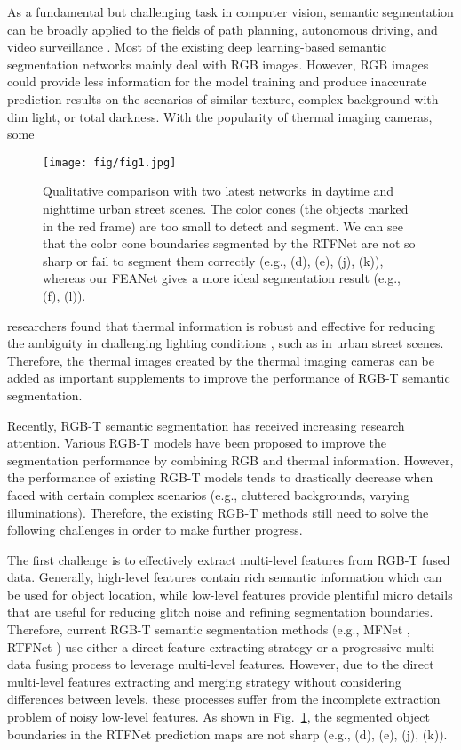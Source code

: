 \documentclass[letterpaper, 10 pt, conference]{ieeeconf}  \usepackage{graphicx}
\begin{document}
As a fundamental but challenging task in computer vision, semantic segmentation can be broadly applied to the fields of path planning, autonomous driving, and video surveillance \cite{kang2011multiband} \cite{li2017traffic} \cite{chen2018importance}. Most of the existing deep learning-based semantic segmentation networks \cite{garcia2017review} \cite{romera2017erfnet} mainly deal with RGB images. However, RGB images could provide less information for the model training and produce inaccurate prediction results on the scenarios of similar texture, complex background with dim light, or total darkness. With the popularity of thermal imaging cameras, some
\begin{figure}[h]
    \centering
    \texttt{[image: fig/fig1.jpg]}
    \vspace{-5mm}
    \caption{Qualitative comparison with two latest networks in daytime and nighttime urban street scenes. The color cones (the objects marked in the red frame) are too small to detect and segment. We can see that the color cone boundaries segmented by the RTFNet are not so sharp or fail to segment them correctly (e.g., (d), (e), (j), (k)), whereas our FEANet gives a more ideal segmentation result (e.g., (f), (l)).}
    \label{fig:fig1}
    \vspace{-5mm}
\end{figure}
researchers found that thermal information is robust and effective for reducing the ambiguity in challenging lighting conditions \cite{ha2017mfnet}, such as in urban street scenes. Therefore, the thermal images created by the thermal imaging cameras can be added as important supplements to improve the performance of RGB-T semantic segmentation.

Recently, RGB-T semantic segmentation has received increasing research attention. Various RGB-T models \cite{sun2019rtfnet} \cite{shivakumar2020pst900} \cite{sun2020fuseseg} have been proposed to improve the segmentation performance by combining RGB and thermal information. However, the performance of existing RGB-T models tends to drastically decrease when faced with certain complex scenarios (e.g., cluttered backgrounds, varying illuminations). Therefore, the existing RGB-T methods still need to solve the following challenges in order to make further progress.

The first challenge is to effectively extract multi-level features from RGB-T fused data. Generally, high-level features contain rich semantic information which can be used for object location, while low-level features provide plentiful micro details that are useful for reducing glitch noise and refining segmentation boundaries. Therefore, current RGB-T semantic segmentation methods (e.g., MFNet \cite{ha2017mfnet}, RTFNet \cite{sun2019rtfnet}) use either a direct feature extracting strategy or a progressive multi-data fusing process to leverage multi-level features. However, due to the direct multi-level features extracting and merging strategy without considering differences between levels, these processes suffer from the incomplete extraction problem of noisy low-level features. As shown in Fig.~\ref{fig:fig1}, the segmented object boundaries in the RTFNet prediction maps are not sharp (e.g., (d), (e), (j), (k)).
\end{document}
